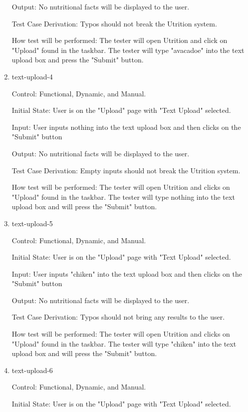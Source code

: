 \documentclass[12pt, titlepage]{article}
\begin{document}
\begin{enumerate}
	Output: No nutritional facts will be displayed to the user.
	
	Test Case Derivation: Typos should not break the Utrition system.
	
	How test will be performed: The tester will open Utrition and click on "Upload" found in the taskbar. The tester will type "avacadoe" into the text upload box and press the "Submit" button.
	
	\item{text-upload-4\\}
	
	Control: Functional, Dynamic, and Manual.
	
	Initial State: User is on the "Upload" page with "Text Upload" selected.
	
	Input: User inputs nothing into the text upload box and then clicks on the "Submit" button
	
	Output: No nutritional facts will be displayed to the user.
	
	Test Case Derivation: Empty inputs should not break the Utrition system.
	
	How test will be performed: The tester will open Utrition and clicks on "Upload" found in the taskbar. The tester will type nothing into the text upload box and will press the "Submit" button.
	
	\item{text-upload-5\\}
	
	Control: Functional, Dynamic, and Manual.
	
	Initial State: User is on the "Upload" page with "Text Upload" selected.
	
	Input: User inputs "chiken" into the text upload box and then clicks on the "Submit" button
	
	Output: No nutritional facts will be displayed to the user.
	
	Test Case Derivation: Typos should not bring any results to the user.
	
	How test will be performed: The tester will open Utrition and clicks on "Upload" found in the taskbar. The tester will type "chiken" into the text upload box and will press the "Submit" button.
	
	\item{text-upload-6\\}
	
	Control: Functional, Dynamic, and Manual.
	
	Initial State: User is on the "Upload" page with "Text Upload" selected.
	

\end{enumerate}
\end{document}
